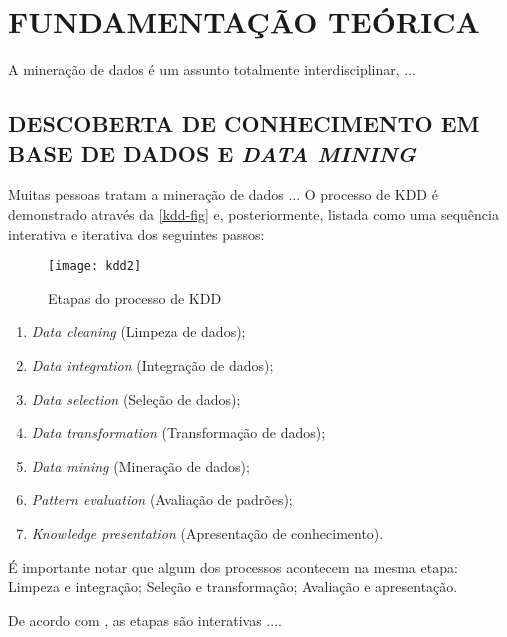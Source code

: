 
\chapter{FUNDAMENTAÇÃO TEÓRICA}\label{ch:fundaments-teorico}
A mineração de dados é um assunto totalmente interdisciplinar, ...

\section{DESCOBERTA DE CONHECIMENTO EM BASE DE DADOS E \textit{DATA MINING}}\label{sec:kdd}
Muitas pessoas tratam a mineração de dados ... O processo de KDD é demonstrado através da  \autoref{kdd-fig} e, posteriormente, listada como uma sequência interativa e iterativa dos seguintes passos:

\begin{figure}[h]
	\centering
	\texttt{[image: kdd2]}
	\caption{Etapas do processo de KDD}
	\label{kdd-fig}
\end{figure}

\begin{enumerate}
	\item \textit{Data cleaning} (Limpeza de dados);
	\item \textit{Data integration} (Integração de dados);
	\item \textit{Data selection} (Seleção de dados);
	\item \textit{Data transformation} (Transformação de dados);
	\item \textit{Data mining} (Mineração de dados);
	\item \textit{Pattern evaluation} (Avaliação de padrões);
	\item \textit{Knowledge presentation} (Apresentação de conhecimento).
\end{enumerate}

É importante notar que algum dos processos acontecem na mesma etapa: Limpeza e integração; Seleção e transformação; Avaliação e apresentação.

De acordo com , as etapas são interativas ....















